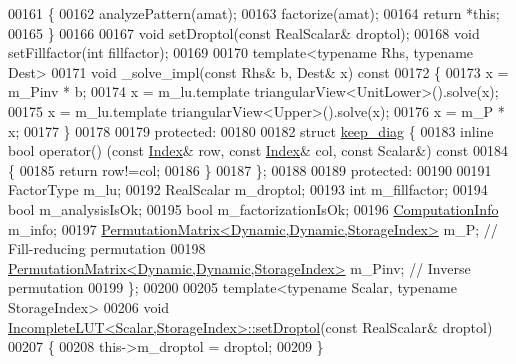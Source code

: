 \begin{DoxyCode}
00161     \{
00162       analyzePattern(amat); 
00163       factorize(amat);
00164       \textcolor{keywordflow}{return} *\textcolor{keyword}{this};
00165     \}
00166 
00167     \textcolor{keywordtype}{void} setDroptol(\textcolor{keyword}{const} RealScalar& droptol); 
00168     \textcolor{keywordtype}{void} setFillfactor(\textcolor{keywordtype}{int} fillfactor); 
00169     
00170     \textcolor{keyword}{template}<\textcolor{keyword}{typename} Rhs, \textcolor{keyword}{typename} Dest>
00171     \textcolor{keywordtype}{void} \_solve\_impl(\textcolor{keyword}{const} Rhs& b, Dest& x)\textcolor{keyword}{ const}
00172 \textcolor{keyword}{    }\{
00173       x = m\_Pinv * b;
00174       x = m\_lu.template triangularView<UnitLower>().solve(x);
00175       x = m\_lu.template triangularView<Upper>().solve(x);
00176       x = m\_P * x; 
00177     \}
00178 
00179 \textcolor{keyword}{protected}:
00180 
00182     \textcolor{keyword}{struct }\hyperlink{struct_eigen_1_1_incomplete_l_u_t_1_1keep__diag}{keep\_diag} \{
00183       \textcolor{keyword}{inline} \textcolor{keywordtype}{bool} operator() (\textcolor{keyword}{const} \hyperlink{namespace_eigen_a62e77e0933482dafde8fe197d9a2cfde}{Index}& row, \textcolor{keyword}{const} \hyperlink{namespace_eigen_a62e77e0933482dafde8fe197d9a2cfde}{Index}& col, \textcolor{keyword}{const} Scalar&)\textcolor{keyword}{ const}
00184 \textcolor{keyword}{      }\{
00185         \textcolor{keywordflow}{return} row!=col;
00186       \}
00187     \};
00188 
00189 \textcolor{keyword}{protected}:
00190 
00191     FactorType m\_lu;
00192     RealScalar m\_droptol;
00193     \textcolor{keywordtype}{int} m\_fillfactor;
00194     \textcolor{keywordtype}{bool} m\_analysisIsOk;
00195     \textcolor{keywordtype}{bool} m\_factorizationIsOk;
00196     \hyperlink{group__enums_ga85fad7b87587764e5cf6b513a9e0ee5e}{ComputationInfo} m\_info;
00197     \hyperlink{group___core___module}{PermutationMatrix<Dynamic,Dynamic,StorageIndex>} m\_P;    
       \textcolor{comment}{// Fill-reducing permutation}
00198     \hyperlink{group___core___module}{PermutationMatrix<Dynamic,Dynamic,StorageIndex>} m\_Pinv; 
       \textcolor{comment}{// Inverse permutation}
00199 \};
00200 
00205 \textcolor{keyword}{template}<\textcolor{keyword}{typename} Scalar, \textcolor{keyword}{typename} StorageIndex>
00206 \textcolor{keywordtype}{void} \hyperlink{group___iterative_linear_solvers___module_a9628c5a595e9e984c72d1f8e671a6925}{IncompleteLUT<Scalar,StorageIndex>::setDroptol}(\textcolor{keyword}{const} 
      RealScalar& droptol)
00207 \{
00208   this->m\_droptol = droptol;   
00209 \}

\end{DoxyCode}

